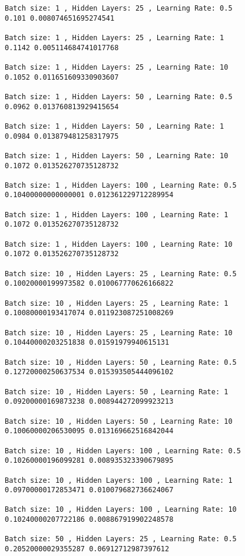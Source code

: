 \documentclass[11pt]{article}
\begin{document}
    \begin{Verbatim}[commandchars=\\\{\}]
Batch size: 1 , Hidden Layers: 25 , Learning Rate: 0.5
0.101 0.008074651695274541

Batch size: 1 , Hidden Layers: 25 , Learning Rate: 1
0.1142 0.005114684741017768

Batch size: 1 , Hidden Layers: 25 , Learning Rate: 10
0.1052 0.011651609330903607

Batch size: 1 , Hidden Layers: 50 , Learning Rate: 0.5
0.0962 0.013760813929415654

Batch size: 1 , Hidden Layers: 50 , Learning Rate: 1
0.0984 0.013879481258317975

Batch size: 1 , Hidden Layers: 50 , Learning Rate: 10
0.1072 0.013526270735128732

Batch size: 1 , Hidden Layers: 100 , Learning Rate: 0.5
0.10400000000000001 0.012361229712289954

Batch size: 1 , Hidden Layers: 100 , Learning Rate: 1
0.1072 0.013526270735128732

Batch size: 1 , Hidden Layers: 100 , Learning Rate: 10
0.1072 0.013526270735128732

Batch size: 10 , Hidden Layers: 25 , Learning Rate: 0.5
0.10020000199973582 0.010067770626166822

Batch size: 10 , Hidden Layers: 25 , Learning Rate: 1
0.10080000193417074 0.011923087251008269

Batch size: 10 , Hidden Layers: 25 , Learning Rate: 10
0.10440000203251838 0.01591979940615131

Batch size: 10 , Hidden Layers: 50 , Learning Rate: 0.5
0.12720000250637534 0.015393505444096102

Batch size: 10 , Hidden Layers: 50 , Learning Rate: 1
0.09200000169873238 0.008944272099923213

Batch size: 10 , Hidden Layers: 50 , Learning Rate: 10
0.10060000206530095 0.013169662516842044

Batch size: 10 , Hidden Layers: 100 , Learning Rate: 0.5
0.10260000196099281 0.008935323390679895

Batch size: 10 , Hidden Layers: 100 , Learning Rate: 1
0.09700000172853471 0.010079682736624067

Batch size: 10 , Hidden Layers: 100 , Learning Rate: 10
0.10240000207722186 0.008867919902248578

Batch size: 50 , Hidden Layers: 25 , Learning Rate: 0.5
0.20520000029355287 0.06912712987397612


\end{Verbatim}
\end{document}
